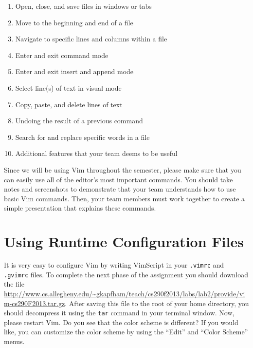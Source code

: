\begin{enumerate}

	\item Open, close, and save files in windows or tabs

	\item Move to the beginning and end of a file

	\item Navigate to specific lines and columns within a file

	\item Enter and exit command mode

	\item Enter and exit insert and append mode

	\item Select line(s) of text in visual mode

	\item Copy, paste, and delete lines of text

	\item Undoing the result of a previous command

	\item Search for and replace specific words in a file 

	\item Additional features that your team deems to be useful

\end{enumerate}

Since we will be using Vim throughout the semester, please make sure that you can easily use all of the editor's most
important commands.  You should take notes and screenshots to demonstrate that your team understands how to use basic
Vim commands.  Then, your team members must work together to create a simple presentation that explains these commands. 

\section*{Using Runtime Configuration Files}

It is very easy to configure Vim by writing VimScript in your {\tt .vimrc} and {\tt .gvimrc} files.  To complete the
next phase of the assignment you should download the file
\url{http://www.cs.allegheny.edu/~gkapfham/teach/cs290f2013/labs/lab2/provide/vim-cs290F2013.tar.gz}.  After saving this
file to the root of your home directory, you should decompress it using the {\tt tar} command in your terminal window.
Now, please restart Vim.  Do you see that the color scheme is different? If you would like, you can customize the color
scheme by using the ``Edit'' and ``Color Scheme'' menus. 

